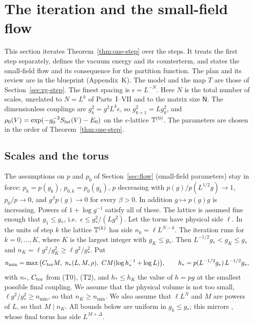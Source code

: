\section{The iteration and the small-field flow}\label{sec:target-flow}

This section iterates Theorem~\ref{thm:one-step} over the steps. It treats the first step separately, defines the vacuum energy and its counterterm, and states the small-field flow and its consequence for the partition function. The plan and its review are in the blueprint (Appendix~K). The model and the map $T$ are those of Section~\ref{sec:rg-step}. The finest spacing is $\epsilon=L^{-N}$. Here $N$ is the total number of scales, unrelated to $N=L^k$ of Parts~I--VII and to the matrix size $\mathsf N$. The dimensionless couplings are $g_k^2=g^2L^k\epsilon$, so $g_{k+1}^2=Lg_k^2$, and $\rho_0(V)=\exp(-g_0^{-2}S_{\rm lat}(V)-E_0)$ on the $\epsilon$-lattice $\mathbb T^{(0)}$. The parameters are chosen in the order of Theorem~\ref{thm:one-step}.

\subsection{Scales and the torus}\label{subsec:tf-scales}

The assumptions on $p$ and $p_0$ of Section~\ref{sec:flow} (small-field parameters) stay in force: $p_k=p(g_k)$, $p_{0,k}=p_0(g_k)$, $p$ decreasing with $p(g)/p(L^{1/2}g)\to1$, $p_0/p\to0$, and $g^\beta p(g)\to0$ for every $\beta>0$. In addition $g\mapsto p(g)g$ is increasing. Powers of $1+\log g^{-1}$ satisfy all of these. The lattice is assumed fine enough that $g_1\le g_*$, i.e.\ $\epsilon\le g_*^2/(Lg^2)$. Let the torus have physical side $\ell$. In the units of step $k$ the lattice $\mathbb T^{(k)}$ has side $n_k=\ell L^{N-k}$. The iteration runs for $k=0,\dots,K$, where $K$ is the largest integer with $g_K\le g_*$. Then $L^{-1/2}g_*<g_K\le g_*$ and $n_K=\ell g^2/g_K^2\ge\ell g^2/g_*^2$. Put
\[
n_{\min}=\max\big(C_{\rm tor}M,\ n_*(L,M,\rho),\ CM(\log h_*^{-1}+\log L)\big),\qquad h_*=p(L^{-1/2}g_*)\,L^{-1/2}g_* ,
\]
with $n_*$, $C_{\rm tor}$ from (T0), (T2), and $h_*\le h_K$ the value of $h=pg$ at the smallest possible final coupling. We assume that the physical volume is not too small, $\ell g^2/g_*^2\ge n_{\min}$, so that $n_K\ge n_{\min}$. We also assume that $\ell L^{N}$ and $M$ are powers of $L$, so that $M\mid n_K$. All bounds below are uniform in $g_k\le g_*$; this mirrors \cite{DimockI}, whose final torus has side $L^{M+\Delta}$.


